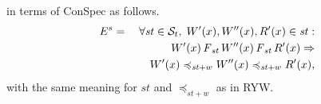\documentclass[journal,compsoc]{IEEEtran}
\begin{document}
  in terms of ConSpec as follows.
  \begin{align}\label{eqn:MW}
\begin{split}
E^{s} = \quad \forall \mathit{st} \in \mathcal{S}_t, \; {W}'(x), {W}''(x), {R}'(x) \in \mathit{st} : \\
 {W}'(x) \operatorname{\it F}_\mathit{st} {W}''(x) \operatorname{\it F}_\mathit{st} {R}'(x)  \Rightarrow \\ {W}'(x) \preccurlyeq_{\mathit{st}+w} {W}''(x) \preccurlyeq_{\mathit{st}+w} {R}'(x), %
\end{split}
  \end{align} with the same meaning for $\mathit{st}$ and $\preccurlyeq_{\mathit{st}+w}$ as in RYW.
\end{document}
